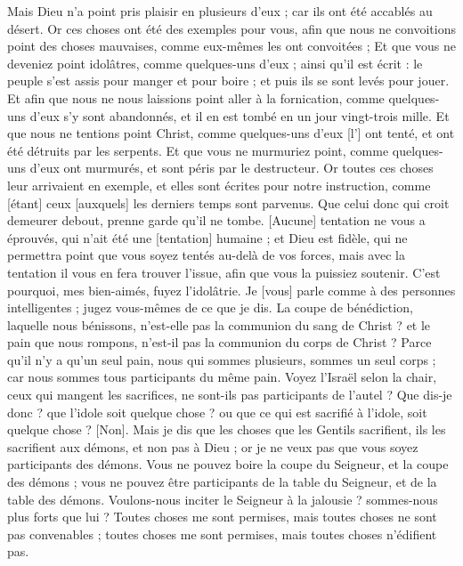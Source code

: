 \begin{multicols}{2}
Mais Dieu n'a point pris plaisir en plusieurs d'eux ; car ils ont été accablés au désert.
Or ces choses ont été des exemples pour vous, afin que nous ne convoitions point des choses mauvaises, comme eux-mêmes les ont convoitées ;
Et que vous ne deveniez point idolâtres, comme quelques-uns d'eux ; ainsi qu'il est écrit : le peuple s'est assis pour manger et pour boire ; et puis ils se sont levés pour jouer.
Et afin que nous ne nous laissions point aller à la fornication, comme quelques-uns d'eux s'y sont abandonnés, et il en est tombé en un jour vingt-trois mille.
Et que nous ne tentions point Christ, comme quelques-uns d'eux [l'] ont tenté, et ont été détruits par les serpents.
Et que vous ne murmuriez point, comme quelques-uns d'eux ont murmurés, et sont péris par le destructeur.
Or toutes ces choses leur arrivaient en exemple, et elles sont écrites pour notre instruction, comme [étant] ceux [auxquels] les derniers temps sont parvenus.
Que celui donc qui croit demeurer debout, prenne garde qu'il ne tombe.
[Aucune] tentation ne vous a éprouvés, qui n'ait été une [tentation] humaine ; et Dieu est fidèle, qui ne permettra point que vous soyez tentés au-delà de vos forces, mais avec la tentation il vous en fera trouver l'issue, afin que vous la puissiez soutenir.
C'est pourquoi, mes bien-aimés, fuyez l'idolâtrie.
Je [vous] parle comme à des personnes intelligentes ; jugez vous-mêmes de ce que je dis.
La coupe de bénédiction, laquelle nous bénissons, n'est-elle pas la communion du sang de Christ ? et le pain que nous rompons, n'est-il pas la communion du corps de Christ ?
Parce qu'il n'y a qu'un seul pain, nous qui sommes plusieurs, sommes un seul corps ; car nous sommes tous participants du même pain.
Voyez l'Israël selon la chair, ceux qui mangent les sacrifices, ne sont-ils pas participants de l'autel ?
Que dis-je donc ? que l'idole soit quelque chose ? ou que ce qui est sacrifié à l'idole, soit quelque chose ? [Non].
Mais je dis que les choses que les Gentils sacrifient, ils les sacrifient aux démons, et non pas à Dieu ; or je ne veux pas que vous soyez participants des démons.
Vous ne pouvez boire la coupe du Seigneur, et la coupe des démons ; vous ne pouvez être participants de la table du Seigneur, et de la table des démons.
Voulons-nous inciter le Seigneur à la jalousie ? sommes-nous plus forts que lui ?
Toutes choses me sont permises, mais toutes choses ne sont pas convenables ; toutes choses me sont permises, mais toutes choses n'édifient pas.

\end{multicols}
